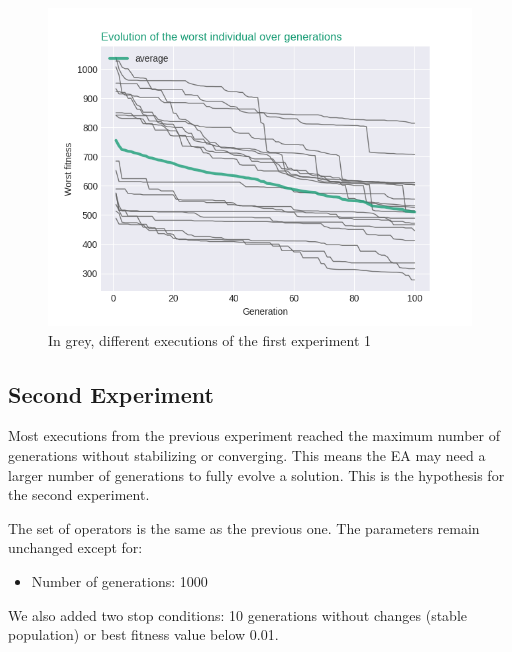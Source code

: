 \documentclass[runningheads,a4paper]{llncs}
\begin{document}
\begin{figure}[H]
	\centering
	\includegraphics[scale=0.55]{exp1_worstIndv.png}
	\caption{In grey, different executions of the first experiment 
	1}\label{f:grahp1}
\end{figure}

\subsection{Second Experiment}

Most executions from the previous experiment reached the maximum number of 
generations without stabilizing or converging. This means the EA may need a 
larger number of generations to fully evolve a solution. This is the hypothesis 
for the second experiment.


The set of operators is the same as the previous one. The parameters remain 
unchanged except for:
\begin{itemize}
	\item Number of generations: 1000
\end{itemize}
We also added two stop conditions: 10 generations without changes (stable 
population) or best fitness value below 0.01.
\end{document}
